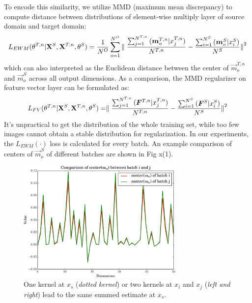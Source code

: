 \documentclass[runningheads]{llncs}
\begin{document}
To encode this similarity, we utilize MMD (maximum mean discrepancy) to compute distance between distributions of element-wise multiply layer of source domain and target domain:
\begin{equation}\label{equation:LMMD}
  L_{EWM}(\theta^{T,n}|{\bf X}^{S},{\bf X}^{T,n},\theta^{S}) = \frac{1}{N^{O}} \sum^{N^{O}}_{o=1}{ \parallel \frac{\sum^{N^{T,n}}_{j=1}{(\vec{m}^{T,n}_{o}|x^{T,n}_{j})}}{N^{T,n}} - \frac{\sum^{N^{S}}_{i=1}{(\vec{m}^{S}_{o}|x^{S}_{i})}}{N^{S}} {\parallel}^{2}  }
\end{equation}
which can also interpreted as the Euclidean distance between the center of $\vec{m}^{T,n}_{o}$ and $\vec{m}^{S}_{o}$ across all output dimensions. As a comparison, the MMD regularizer on feature vector layer can be formulated as:
\begin{equation}\label{equation:LMMD}
  L_{FV}(\theta^{T,n}|{\bf X}^{S},{\bf X}^{T,n},\theta^{S}) = \parallel \frac{\sum^{N^{T,n}}_{j=1}{(\vec{F}^{T,n}|x^{T,n}_{j})}}{N^{T,n}} - \frac{\sum^{N^{S}}_{i=1}{(\vec{F}^{S}|x^{S}_{i})}}{N^{S}} {\parallel}^{2}
\end{equation}
It's unpractical to get the distribution of the whole training set, while too few images cannot obtain a stable distribution for regularization. In our experiments, the $L_{EWM}(\cdot)$ loss is calculated for every batch. An example comparison of centers of $\vec{m}^{S}_{o}$ of different batches are shown in Fig x(1).

\begin{figure}
\centering
\includegraphics[height=6cm]{images/mmd2.pdf}
\caption{One kernel at $x_s$ ({\it dotted kernel}) or two kernels at
$x_i$ and $x_j$ ({\it left and right}) lead to the same summed estimate
at $x_s$. }
\label{fig:example}
\end{figure}
\end{document}
